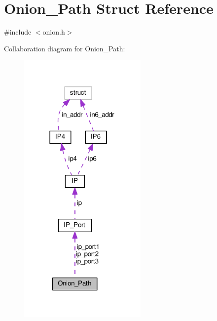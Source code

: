 \hypertarget{struct_onion___path}{\section{Onion\+\_\+\+Path Struct Reference}
\label{struct_onion___path}
}


{\ttfamily \#include $<$onion.\+h$>$}



Collaboration diagram for Onion\+\_\+\+Path\+:
\nopagebreak
\begin{figure}[H]
\begin{center}
\leavevmode
\includegraphics[width=178pt]{d2/d03/struct_onion___path__coll__graph}
\end{center}
\end{figure}
